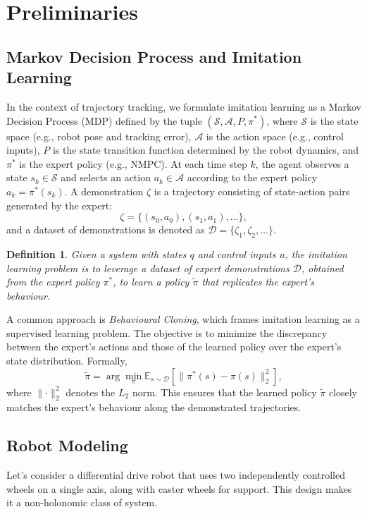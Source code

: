 \documentclass[letterpaper, 10 pt, conference]{ieeeconf}
\newtheorem{definition}{Definition}
\begin{document}
\section{Preliminaries}\label{sec:prelims}
\subsection{Markov Decision Process and Imitation Learning}\label{sec:MDP}
In the context of trajectory tracking, we formulate imitation learning as a Markov Decision Process (MDP) defined by the tuple $(\mathcal{S}, \mathcal{A}, P, \pi^*)$, where $\mathcal{S}$ is the state space (e.g., robot pose and tracking error), $\mathcal{A}$ is the action space (e.g., control inputs), $P$ is the state transition function determined by the robot dynamics, and $\pi^*$ is the expert policy (e.g., NMPC). At each time step $k$, the agent observes a state $s_k \in \mathcal{S}$ and selects an action $a_k \in \mathcal{A}$ according to the expert policy $a_k = \pi^*(s_k)$.
%
A demonstration $\zeta$ is a trajectory consisting of state-action pairs generated by the expert:
\begin{equation*}
  \zeta = \{(s_0,a_0),(s_1,a_1),\dots\},
\end{equation*}
and a dataset of demonstrations is denoted as $\mathcal{D} = \{\zeta_1,\zeta_2,\dots\}$.

\begin{definition}
  Given a system with states $q$ and control inputs $u$, the imitation learning problem is to leverage a dataset of expert demonstrations $\mathcal{D}$, obtained from the expert policy $\pi^*$, to learn a policy $\tilde{\pi}$ that replicates the expert’s behaviour.
\end{definition}

A common approach is \textit{Behavioural Cloning}, which frames imitation learning as a supervised learning problem. The objective is to minimize the discrepancy between the expert’s actions and those of the learned policy over the expert’s state distribution. Formally,
\begin{equation}
  \tilde{\pi} = \arg\min_{\pi} \mathbb{E}_{s \sim \mathcal{D}} \left[ \lVert \pi^*(s) - \pi(s) \rVert_2^2 \right],
\end{equation}
where $\lVert \cdot \rVert_2^2$ denotes the $L_2$ norm. This ensures that the learned policy $\tilde{\pi}$ closely matches the expert’s behaviour along the demonstrated trajectories.

\subsection{Robot Modeling} \label{sec:robot-modeling}
Let's consider a differential drive robot that uses two independently controlled wheels on a single axis, along with caster wheels for support. This design makes it a non-holonomic class of system.
\end{document}
